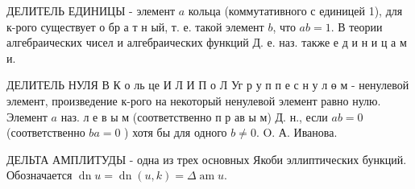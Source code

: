 \documentclass[10pt]{article}
\begin{document}
ДЕЛИТЕЛЬ ЕДИНИЦЫ - элемент $a$ кольца (коммутативного с единицей 1), для к-рого существует о бр а т н ый, т. е. такой элемент $b$, что $a b=1$. В теории алгебраических чисел и алгебраических функций Д. е. наз. также е д и н и ц а м и.



ДЕЛИТЕЛЬ НУЛЯ В К о ль це И Л И П о Л Уг р у п п е с н у л ө м - ненулевой элемент, произведение к-рого на некоторый ненулевой элемент равно нулю. Элемент $a$ наз. л е в ы м (соответственно п р ав ы м) Д. н., если $a b=0$ (соответственно $b a=0$ ) хотя бы для одного $b \neq 0$. O. А. Иванова.



ДЕЛЬТА АМПЛИТУДЫ - одна из трех основных Якоби эллиптических бункций. Обозначается $\operatorname{dn} u=\operatorname{dn}(u, k)=\Delta \operatorname{am} u$.
\end{document}
